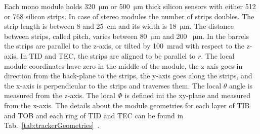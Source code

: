 Each mono module holds 320~$\mathrm{\mu m}$ or 500~$\mathrm{\mu m}$ thick silicon sensors with either 512 or 768 silicon strips. In case of stereo modules the number of strips doubles. The strip length is between 8 and 25~cm and its width is 18~$\mathrm{\mu m}$. The distance between strips, called pitch, varies between 80~$\mathrm{\mu m}$ and 200 ~$\mathrm{\mu m}$. In the barrels the strips are parallel to the z-axis, or tilted by 100~mrad with respect to the z-axis. In TID and TEC, the strips are aligned to be parallel to $r$. The local module coordinates have zero in the middle of the module, the z-axis goes in direction from the back-plane to the strips, the y-axis goes along the strips, and the x-axis is perpendicular to the strips and traverses them. The local $\theta$ angle is measured from the z-axis. The local $\Phi$ is defined ini the xy-plane and measured from the x-axis. The details about the module geometries for each layer of TIB and TOB and each ring of TID and TEC can be found in Tab.~\ref{tab:trackerGeometries}~\cite{website:hephyPage}.


